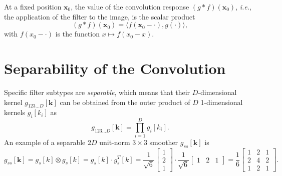 \documentclass[fleqn,a4paper,oneside,openany]{book}
\begin{document}
At a fixed position $\boldsymbol{x}_0$, the value of the convolution response $(g\ast f)(\boldsymbol{x}_0)$, \textit{i.e.}, the application of the filter to the image, is the scalar product 
%
\begin{equation}\label{eq:scalProd}
(g\ast f)(\boldsymbol{x}_0)=
\langle f(\boldsymbol{x}_0 -\cdot) , g( \cdot) \rangle,
\end{equation}
with $f(x_0 - \cdot)$ is the function $x \mapsto f(x_0 - x)$.
%
\section{Separability of the Convolution}\label{sec:separableConv}
%
Specific filter subtypes are \emph{separable}, which means that their $D$-dimensional kernel $g_{123\dots D}[\boldsymbol{k}]$ can be obtained from the outer product of $D$ 1-dimensional kernels $g_i[k_i]$ as
%
\begin{equation}\label{eq:separability}
g_{123\dots D}[\boldsymbol{k}]=\prod_{i=1}^D g_i[k_i].
\end{equation}
%
An example of a separable 2$D$ unit-norm $3\times 3$ smoother $g_{ss}[\boldsymbol{k}]$ is
\begin{equation}\label{eq:separabilityExample}
g_{ss}[\boldsymbol{k}]= g_{s}[k]\otimes g_{s}[k]=
g_{s}[k]\cdot g_{s}^T[k]=
\frac{1}{\sqrt{6}}\begin{bmatrix}1 \\ 2 \\ 1\end{bmatrix} \cdot
\frac{1}{\sqrt{6}}\begin{bmatrix}1 & 2 & 1\end{bmatrix}=
\frac{1}{6}\begin{bmatrix}1 & 2 & 1 \\ 2 & 4 & 2 \\ 1 & 2 & 1\end{bmatrix}.   
\end{equation}
\end{document}
